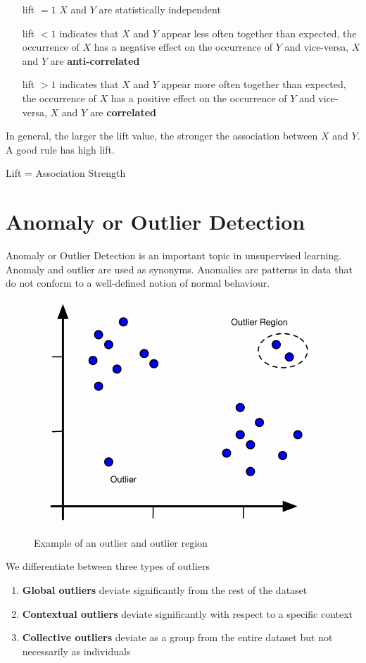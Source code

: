 \documentclass[11pt]{article}
\begin{document}
\begin{itemize}[leftmargin=*, labelindent=3cm, labelsep=1cm]
    \item[lift $= 1$] $X$ and $Y$ are statistically independent
    \item[lift $< 1$] indicates that $X$ and $Y$ appear less often together than expected, the occurrence of $X$ has a negative effect on the occurrence of $Y$ and vice-versa, $X$ and $Y$ are \textbf{anti-correlated}
    \item[lift $> 1$] indicates that $X$ and $Y$ appear more often together than expected, the occurrence of $X$ has a positive effect on the occurrence of $Y$ and vice-versa, $X$ and $Y$ are \textbf{correlated}
\end{itemize}

In general, the larger the lift value, the stronger the association between $X$ and $Y$. A good rule has high lift.

\begin{theorem}
    Lift = Association Strength
\end{theorem}

\section{Anomaly or Outlier Detection}

Anomaly or Outlier Detection is an important topic in unsupervised learning. Anomaly and outlier are used as synonyms. Anomalies are patterns in data that do not conform to a well-defined notion of normal behaviour.

\begin{figure}[tbh!]
    \centering
    \includegraphics[width=0.4\linewidth, keepaspectratio]{Pictures/outlier_examples}
    \caption{Example of an outlier and outlier region}
    \label{fig:outlierexamples}
\end{figure}

We differentiate between three types of outliers

\begin{enumerate}
    \item \textbf{Global outliers} deviate significantly from the rest of the dataset
    \item \textbf{Contextual outliers} deviate significantly with respect to a specific context
    \item \textbf{Collective outliers} deviate as a group from the entire dataset but not necessarily as individuals
\end{enumerate}
\end{document}
